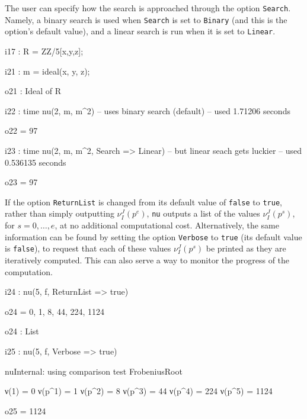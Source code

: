 \documentclass{amsart}
\begin{document}
The user can specify how the search is approached through the  option \texttt{Search}.  Namely, a binary search is used when \texttt{Search} is set to \texttt{Binary} (and this is the option's default value), and a linear search is run when it is set to \texttt{Linear}.

\bigskip
{\small
{}
\begin{MyVerbatim}
i17 : R = ZZ/5[x,y,z];

i21 : m = ideal(x, y, z);

o21 : Ideal of R

i22 : time nu(2, m, m^2) -- uses binary search (default)
     -- used 1.71206 seconds

o22 = 97

i23 : time nu(2, m, m^2, Search => Linear) -- but linear seach gets luckier
     -- used 0.536135 seconds

o23 = 97
\end{MyVerbatim}
}
\bigskip


If the option \texttt{ReturnList} is changed from its default value of \texttt{false} to \texttt{true}, rather than simply outputting $\nu_I^J(p^e)$, \texttt{nu} outputs a list of the values $\nu_I^J(p^s)$, for $s=0,\ldots,e$, at no additional computational cost.
Alternatively, the same information can be found by setting the option \texttt{Verbose} to \texttt{true} (its default value is \texttt{false}), to request that each of these values $\nu_I^J(p^s)$ be printed as they are iteratively computed.  This can also serve a way to monitor the progress of the computation.

\bigskip
{\small
{}
\begin{MyVerbatim}
i24 : nu(5, f, ReturnList => true)

o24 = {0, 1, 8, 44, 224, 1124}

o24 : List

i25 : nu(5, f, Verbose => true)

nuInternal: using comparison test FrobeniusRoot

ν(1) = 0
ν(p^1) = 1
ν(p^2) = 8
ν(p^3) = 44
ν(p^4) = 224
ν(p^5) = 1124

o25 = 1124
\end{MyVerbatim}
}
\bigskip
\end{document}
